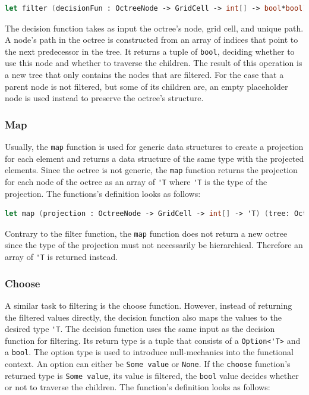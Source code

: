 \begin{lstlisting}[language = FSharp]
let filter (decisionFun : OctreeNode -> GridCell -> int[] -> bool*bool) (tree: Octree) : (Octree)= ...
\end{lstlisting}

The decision function takes as input the octree's node, grid cell, and unique path. A node's path in the octree is constructed from an array of indices that point to the next predecessor in the tree. It returns a tuple of \verb|bool|, deciding whether to use this node and whether to traverse the children. The result of this operation is a new tree that only contains the nodes that are filtered. For the case that a parent node is not filtered, but some of its children are, an empty placeholder node is used instead to preserve the octree's structure. 


\subsubsection{Map}

Usually, the \verb|map| function is used for generic data structures to create a projection for each element and returns a data structure of the same type with the projected elements. Since the octree is not generic, the \verb|map| function returns the projection for each node of the octree as an array of \verb|'T| where \verb|'T| is the type of the projection. 
The functions's definition looks as follows: 

\begin{lstlisting}[language = FSharp]
let map (projection : OctreeNode -> GridCell -> int[] -> 'T) (tree: Octree) : ('T[])= ...
\end{lstlisting}

Contrary to the filter function, the \verb|map| function does not return a new octree since the type of the projection must not necessarily be hierarchical. Therefore an array of \verb|'T| is returned instead. 


\subsubsection{Choose}

A similar task to filtering is the choose function. However, instead of returning the filtered values directly, the decision function also maps the values to the desired type \verb|'T|. The decision function uses the same input as the decision function for filtering. Its return type is a tuple that consists of a \verb|Option<'T>| and a \verb|bool|. The option type is used to introduce null-mechanics into the functional context. An option can either be \verb|Some value| or \verb|None|. If the \verb|choose| function's returned type is \verb|Some value|, its value is filtered, the \verb|bool| value decides whether or not to traverse the children. 
The function's definition looks as follows: 

